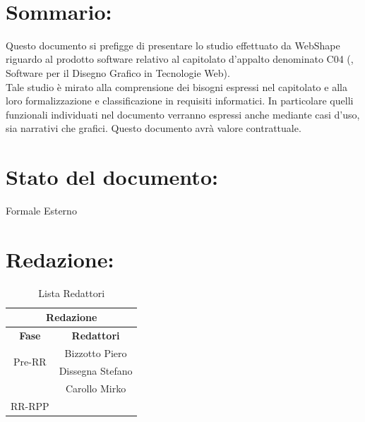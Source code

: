 \newpage


\begin{center} %
	\begin{Huge}	
				\textbf{\TITOLODOC}
			\\
	\end{Huge}
\end{center}
\parindent=18pt %
\section*{\LARGE Sommario:} %
Questo documento si prefigge di presentare lo studio effettuato da WebShape riguardo al prodotto software relativo al capitolato d'appalto denominato C04 (\blue{\ajax}, Software per il Disegno Grafico in Tecnologie Web).\\
Tale studio \`e mirato alla comprensione dei bisogni espressi nel capitolato e alla loro formalizzazione e classificazione in requisiti informatici. In particolare quelli funzionali individuati nel documento verranno espressi anche mediante casi d'uso, sia narrativi che grafici. Questo documento avr\`a valore contrattuale.

\section*{\LARGE Stato del documento:}
	Formale Esterno
\hangindent=0pt

\section*{\LARGE Redazione:}
	\begin{table}[!h]
		\begin{center}
			\begin{tabular}
				{|c|c|}
				\hline
				\multicolumn{2}{|c|}{ \textbf{Redazione} } \\
				\hline
				\textbf{Fase} & \textbf{Redattori} \\
				\hline
				\multirow{2}{*}{Pre-RR} & Bizzotto Piero\\
										& Dissegna Stefano\\
										& Carollo Mirko\\
				\hline
				\multirow{2}{*}{RR-RPP} & \\
										& \\
				\hline
			\end{tabular}
			\caption{Lista Redattori} %
			\label{tabredazione}
		\end{center}
	\end{table}	
